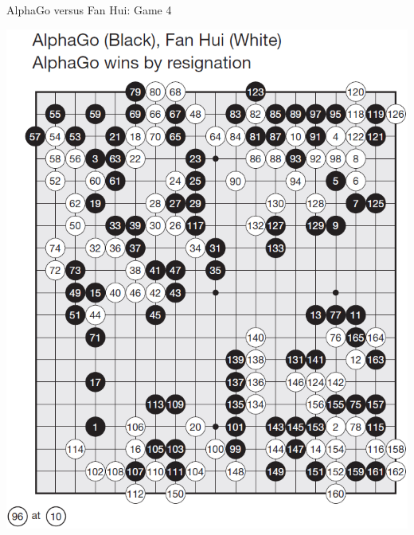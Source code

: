 \documentclass{beamer}
\begin{document}
{    \begin{frame}{AlphaGo versus Fan Hui: Game 4}
      \begin{center}
        \includegraphics[height=.9\textheight]{../img/AlphaGo_vs_Fan_Hui_Game_4.png}
      \end{center}
    \end{frame}

}
\end{document}
